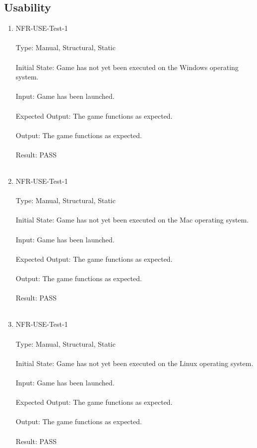 \documentclass[12pt, titlepage]{article}
\begin{document}
\subsection{Usability}
\begin{enumerate}

\item{NFR-USE-Test-1\\\\}
Type: Manual, Structural, Static	\\\\			
Initial State: Game has not yet been executed on the Windows operating system.\\\\
Input: Game has been launched.\\\\					
Expected Output: The game functions as expected.\\\\
Output: The game functions as expected.\\\\
Result: PASS\\\\

\item{NFR-USE-Test-1\\\\}
Type: Manual, Structural, Static	\\\\			
Initial State: Game has not yet been executed on the Mac operating system.\\\\
Input: Game has been launched.\\\\					
Expected Output: The game functions as expected.\\\\
Output: The game functions as expected.\\\\
Result: PASS\\\\

\newpage
\item{NFR-USE-Test-1\\\\}
Type: Manual, Structural, Static	\\\\			
Initial State: Game has not yet been executed on the Linux operating system.\\\\
Input: Game has been launched.\\\\					
Expected Output: The game functions as expected.\\\\
Output: The game functions as expected.\\\\
Result: PASS\\\\

\end{enumerate}
\end{document}
